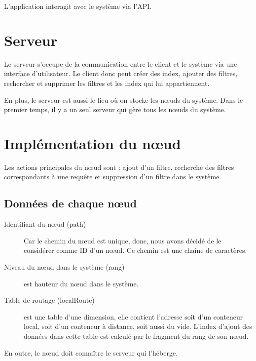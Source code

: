 \documentclass[a4paper,11pt]{report}
\begin{document}
	L'application interagit avec le système via l'API.
	
\section{Serveur}
	Le serveur s'occupe de la communication entre le client et le système via une interface d'utilisateur. Le client donc peut créer des index, ajouter des filtres, rechercher et supprimer les filtres et les index qui lui appartiennent.
	
	En plus, le serveur est aussi le lieu où on stocke les nœuds du système. Dans le premier temps, il y a un seul serveur qui gère tous les nœuds du système.
	
\section{Implémentation du nœud}
	Les actions principales du nœud sont : ajout d'un filtre, recherche des filtres correspondants à une requête et suppression d'un filtre dans le système.
\subsection{Données de chaque nœud}
	\begin{description}
		\item[Identifiant du nœud (path)] Car le chemin du nœud est unique, donc, nous avons décidé de le considérer comme ID d'un nœud. Ce chemin est une chaîne de caractères.
		\item[Niveau du nœud dans le système (rang)] est hauteur du nœud dans le système.
		\item[Table de routage (localRoute)] est une table d'une dimension, elle contient l'adresse soit d'un conteneur local, soit d'un conteneur à distance, soit aussi du vide. L'index d'ajout des données dans cette table est calculé par le fragment du rang de son nœud.
	\end{description}
	
	En outre, le nœud doit connaître le serveur qui l'héberge.
\end{document}
